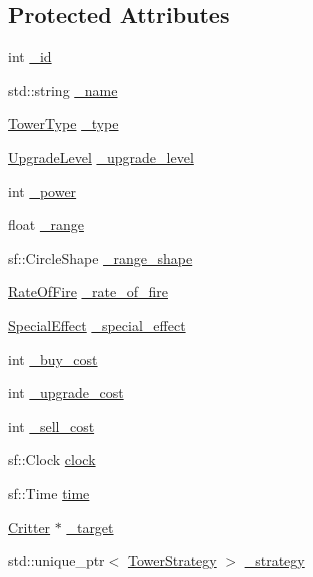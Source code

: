 \subsection*{Protected Attributes}
\begin{DoxyCompactItemize}
\item 
int \hyperlink{class_tower_a02ec2f8d1c4dea2f7fc002d8626c8b28}{\+\_\+id}
\item 
std\+::string \hyperlink{class_tower_ac29247d1ed8c97c105f5f1e05fb1f92c}{\+\_\+name}
\item 
\hyperlink{class_tower_a110a21c18d4ec095c6234bd17f004b3e}{Tower\+Type} \hyperlink{class_tower_adebb7de2d38284d29e3ca6b37c4a2be9}{\+\_\+type}
\item 
\hyperlink{class_tower_a23889cd9ee2fbae0420c97105fd6ebc8}{Upgrade\+Level} \hyperlink{class_tower_a0172731487da6a0480901e031e2aecbe}{\+\_\+upgrade\+\_\+level}
\item 
int \hyperlink{class_tower_af9e223c165f5632944868df3dfc70bee}{\+\_\+power}
\item 
float \hyperlink{class_tower_a77cd5002dac75320f83fb540a3878936}{\+\_\+range}
\item 
sf\+::\+Circle\+Shape \hyperlink{class_tower_ae1c75d802145f4b64d6a42820557e708}{\+\_\+range\+\_\+shape}
\item 
\hyperlink{class_tower_ae82ae8201f8921eb64878d2c9ecb5bb2}{Rate\+Of\+Fire} \hyperlink{class_tower_a746898a9884a60cf09c5b4d0f1fdac2a}{\+\_\+rate\+\_\+of\+\_\+fire}
\item 
\hyperlink{class_tower_a355ab1cbcfd8c4d037ccf8937f784445}{Special\+Effect} \hyperlink{class_tower_ad6a84071c2e7f48386443c469961116c}{\+\_\+special\+\_\+effect}
\item 
int \hyperlink{class_tower_a102680a58c45f98a79609ce8961a7bed}{\+\_\+buy\+\_\+cost}
\item 
int \hyperlink{class_tower_ade771f89ab1aecb165efb74592e71261}{\+\_\+upgrade\+\_\+cost}
\item 
int \hyperlink{class_tower_a7f50414500ec524ccc6ffb7069328d1e}{\+\_\+sell\+\_\+cost}
\item 
sf\+::\+Clock \hyperlink{class_tower_a3b6e91ecba4f6dadb4e5ed3514f970e9}{clock}
\item 
sf\+::\+Time \hyperlink{class_tower_a2536099ae99cd22eef6d84259dab5ed7}{time}
\item 
\hyperlink{class_critter}{Critter} $\ast$ \hyperlink{class_tower_a8ce9a2da58e6b3563ffddf1ff70826e4}{\+\_\+target}
\item 
std\+::unique\+\_\+ptr$<$ \hyperlink{class_tower_strategy}{Tower\+Strategy} $>$ \hyperlink{class_tower_a1fe38f81de5f23293d088c7aa69f3e1e}{\+\_\+strategy}
\end{DoxyCompactItemize}


